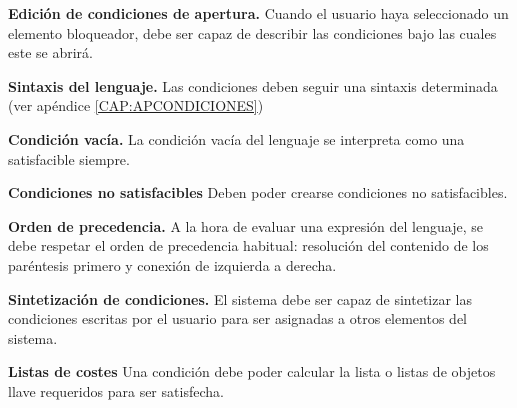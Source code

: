 \item \textbf{Edición de condiciones de apertura.}\newline
	Cuando el usuario haya seleccionado un elemento bloqueador, debe ser capaz de describir las condiciones bajo las cuales este se abrirá.
	\begin{functional}
		\item \textbf{Sintaxis del lenguaje.}\newline
			Las condiciones deben seguir una sintaxis determinada (ver apéndice \ref{CAP:APCONDICIONES})
		\item \textbf{Condición vacía.}\newline
			La condición vacía del lenguaje se interpreta como una satisfacible siempre.
		\item \textbf{Condiciones no satisfacibles}\newline
			Deben poder crearse condiciones no satisfacibles.
		\item \textbf{Orden de precedencia.}\newline
			A la hora de evaluar una expresión del lenguaje, se debe respetar el orden de precedencia habitual: resolución del contenido de los paréntesis primero y conexión de izquierda a derecha.
	\end{functional}
\item \textbf{Sintetización de condiciones.}\newline
	El sistema debe ser capaz de sintetizar las condiciones escritas por el usuario para ser asignadas a otros elementos del sistema.
\item \textbf{Listas de costes}\newline
	Una condición debe poder calcular la lista o listas de objetos llave requeridos para ser satisfecha.